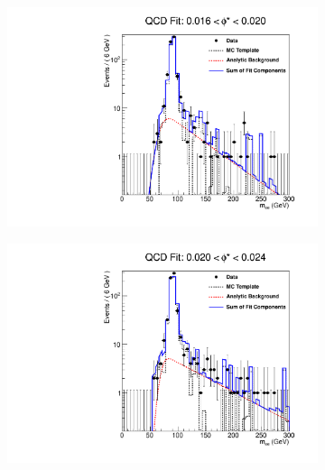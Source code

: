 \begin{figure}[!htbp]
    \centering
    \begin{subfigure}[b]{\SideBySidePlotWidth}
        \includegraphics[width=\linewidth]{figures/qcd_fits/qcd_fit_plot_for_05.pdf}
        \caption{}
        \label{fig:qcd_fit_05}
    \end{subfigure}%
    \begin{subfigure}[b]{\SideBySidePlotWidth}
        \includegraphics[width=\linewidth]{figures/qcd_fits/qcd_fit_plot_for_06.pdf}
        \caption{}
        \label{fig:qcd_fit_06}
    \end{subfigure}
    \begin{subfigure}[b]{\SideBySidePlotWidth}

\end{subfigure}
\end{figure}
